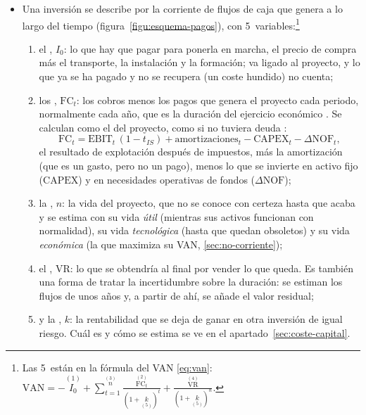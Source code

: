 \documentclass[11pt]{article}
\begin{document}
\begin{itemize}
\item Una inversión se describe por la corriente de flujos de caja que genera a lo largo del tiempo (figura~\ref{figu:esquema-pagos}), con 5~variables:\footnote{Las 5~están en la fórmula del VAN \eqref{eq:van}: $\mathrm{VAN}=-\overset{\scriptscriptstyle(1)}{I_0}+\sum_{t=1}^{\overset{\scriptscriptstyle(3)}{n}}\frac{\overset{\scriptscriptstyle(2)}{\mathrm{FC}_t}}{(1+\underset{\scriptscriptstyle(5)}{k})^t}+\frac{\overset{\scriptscriptstyle(4)}{\mathrm{VR}}}{(1+\underset{\scriptscriptstyle(5)}{k})^n}$.}
  \begin{enumerate}
  \item el , $I_0$: lo que hay que pagar para ponerla en marcha, el precio de compra más el transporte, la instalación y la formación; va ligado al proyecto, y lo que ya se ha pagado y no se recupera (un coste hundido) no cuenta;
  \item los , $\mathrm{FC}_t$: los cobros menos los pagos que genera el proyecto cada periodo, normalmente cada año, que es la duración del ejercicio económico . Se calculan como el  del proyecto, como si no tuviera deuda :
  \[
  \mathrm{FC}_t=\mathrm{EBIT}_t\,(1-t_{IS})+\text{amortizaciones}_t-\mathrm{CAPEX}_t-\Delta\mathrm{NOF}_t,
  \]
  el resultado de explotación después de impuestos, más la amortización (que es un gasto, pero no un pago), menos lo que se invierte en activo fijo ($\mathrm{CAPEX}$) y en necesidades operativas de fondos ($\Delta\mathrm{NOF}$);
  \item la , $n$: la vida del proyecto, que no se conoce con certeza hasta que acaba y se estima con su vida \emph{útil} (mientras sus activos funcionan con normalidad), su vida \emph{tecnológica} (hasta que quedan obsoletos) y su vida \emph{económica} (la que maximiza su VAN, \ref{sec:no-corriente});
  \item el , $\mathrm{VR}$: lo que se obtendría al final por vender lo que queda. Es también una forma de tratar la incertidumbre sobre la duración: se estiman los flujos de unos años y, a partir de ahí, se añade el valor residual;
  \item y la , $k$: la rentabilidad que se deja de ganar en otra inversión de igual riesgo. Cuál es y cómo se estima se ve en el apartado~\ref{sec:coste-capital}.
  \end{enumerate}
\end{itemize}
\end{document}
